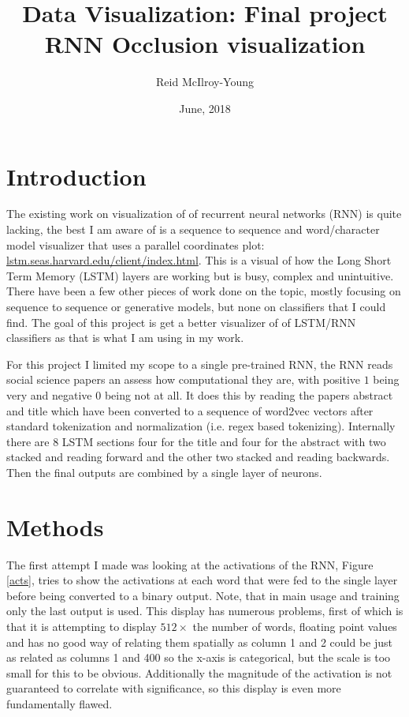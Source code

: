 \documentclass[12pt, a4paper]{article}
\author{Reid McIlroy-Young}
\title{Data Visualization: Final project\\RNN Occlusion visualization}
\date{June, 2018}
\begin{document}
\maketitle
\section*{Introduction}
	
The existing work on visualization of of recurrent neural networks (RNN) is quite lacking, the best I am aware of is a sequence to sequence and word/character model visualizer that uses a parallel coordinates plot: \href{http://lstm.seas.harvard.edu/client/index.html}{lstm.seas.harvard.edu/client/index.html}. This is a visual of how the Long Short Term Memory (LSTM) layers are working but is busy, complex and unintuitive. There have been a few other pieces of work done on the topic, mostly focusing on sequence to sequence or generative models, but none on classifiers that I could find. The goal of this project is get a better visualizer of of LSTM/RNN classifiers as that is what I am using in my work.

For this project I limited my scope to a single pre-trained RNN, the RNN reads social science papers an assess how computational they are, with positive $1$ being very and negative $0$ being not at all. It does this by reading the papers abstract and title which have been converted to a sequence of word2vec vectors after standard tokenization and normalization (i.e. regex based tokenizing). Internally there are 8 LSTM sections four for the title and four for the abstract with two stacked and reading forward and the other two stacked and reading backwards. Then the final outputs are combined by a single layer of neurons.

\section*{Methods}

The first attempt I made was looking at the activations of the RNN, Figure \ref{acts}, tries to show the activations at each word that were fed to the single layer before being converted to a binary output. Note, that in main usage and training only the last output is used. This display has numerous problems, first of which is that it is attempting to display $512 \times $ the number of words, floating point values and has no good way of relating them spatially as column 1 and 2 could be just as related as columns 1 and 400 so the x-axis is categorical, but the scale is too small for this to be obvious. Additionally the magnitude of the activation is not guaranteed to correlate with significance, so this display is even more fundamentally flawed.
	
\end{document}
